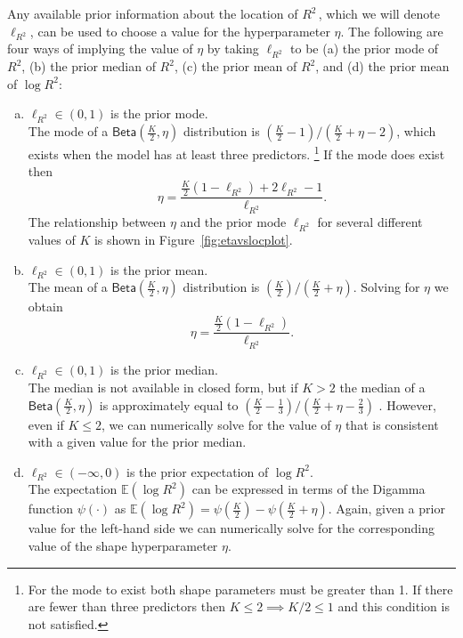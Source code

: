 \documentclass[11pt]{article}
\newcommand{\Rsq}{$R^2\,$}
\newcommand{\locRsq}{\ell_{R^2}}
\newcommand{\halfK}{\frac{K}{2}}
\newcommand{\Betadist}[2]{\mathsf{Beta}\left(#1,#2\right)}
\newcommand{\Digamma}[1]{\psi\left(#1\right)}
\begin{document}
Any available prior information about the location of \Rsq, which we will denote
$\locRsq$, can be used to choose a value for the hyperparameter $\eta$. The
following are four ways of implying the value of $\eta$ by taking $\locRsq$ to
be (a) the prior mode of $R^2$, (b) the prior median of $R^2$, (c) the prior
mean of $R^2$, and (d) the prior mean of $\log{R^2}$:

\begin{enumerate}[(a)]
\item $\locRsq \in \left(0,1\right)$ is the prior mode. \\[5pt]
%
The mode of a $\Betadist{\halfK}{\eta}$ distribution is
$\left(\halfK - 1\right) / \left(\halfK + \eta - 2\right)$, which exists when
the model has at least three predictors.%
\footnote{For the mode to exist both shape parameters must be greater than 1. If
there are fewer than three predictors then $K \leq 2 \implies K/2 \leq 1$ and
this condition is not satisfied.}
If the mode does exist then
%
$$\eta = \frac{\halfK \left(1 - \locRsq\right) + 2\locRsq - 1}{\locRsq}.$$
%
The relationship between $\eta$ and the prior mode $\locRsq$ for
several different values of $K$ is shown in Figure~\ref{fig:etavslocplot}.

\item $\locRsq \in \left(0,1\right)$ is the prior mean. \\[5pt]
%
The mean of a $\Betadist{\halfK}{\eta}$ distribution is
$\left(\halfK\right) / \left(\halfK + \eta\right)$. Solving for $\eta$ we obtain
%
$$\eta = \frac{\halfK \left(1 - \locRsq \right)}{\locRsq}.$$

\item $\locRsq \in \left(0,1\right)$ is the prior median. \\[5pt]
%
The median is not available in closed form, but if $K > 2$ the median of a
$\Betadist{\halfK}{\eta}$ is approximately equal to
$\left(\halfK - \frac{1}{3}\right) / \left(\halfK + \eta - \frac{2}{3}\right)$
\cite{kerman}. However, even if $K \leq 2$, we can numerically solve for the
value of $\eta$ that is consistent with a given value for the prior median.

\item $\locRsq \in \left(-\infty,0\right)$ is the prior expectation of
$\log{R^2}$. \\[5pt]
%
The expectation $\mathbb{E}\left(\log{R^2}\right)$ can be expressed in terms of
the Digamma function $\Digamma{\cdot}$ as
$\mathbb{E}\left(\log{R^2}\right) = \Digamma{\halfK} - \Digamma{\halfK + \eta}$.
Again, given a prior value for the left-hand side we can numerically solve for
the corresponding value of the shape hyperparameter $\eta$.
\end{enumerate}
\end{document}
